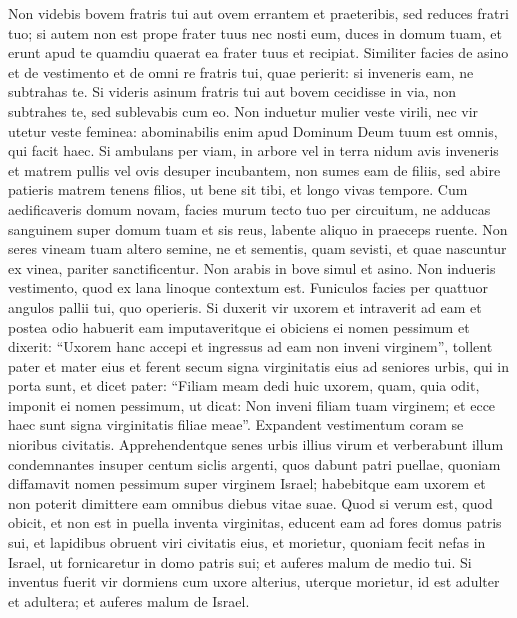 \begin{biblechapter} 
\verse Non videbis bovem fratris tui aut ovem errantem et praeteribis, sed reduces fratri tuo;  
\verse si autem non est prope frater tuus nec nosti eum, duces in domum tuam, et erunt apud te quamdiu quaerat ea frater tuus et recipiat. 
\verse Similiter facies de asino et de vestimento et de omni re fratris tui, quae perierit: si inveneris eam, ne subtrahas te. 
\verse Si videris asinum fratris tui aut bovem cecidisse in via, non subtrahes te, sed sublevabis cum eo. 
\verse Non induetur mulier veste virili, nec vir utetur veste feminea: abominabilis enim apud Dominum Deum tuum est omnis, qui facit haec. 
\verse Si ambulans per viam, in arbore vel in terra nidum avis inveneris et matrem pullis vel ovis desuper incubantem, non sumes eam de filiis, 
\verse sed abire patieris matrem tenens filios, ut bene sit tibi, et longo vivas tempore. 
\verse Cum aedificaveris domum novam, facies murum tecto tuo per circuitum, ne adducas sanguinem super domum tuam et sis reus, labente aliquo in praeceps ruente. 
\verse Non seres vineam tuam altero semine, ne et sementis, quam sevisti, et quae nascuntur ex vinea, pariter sanctificentur. 
\verse Non arabis in bove simul et asino. 
\verse Non indueris vestimento, quod ex lana linoque contextum est. 
\verse Funiculos facies per quattuor angulos pallii tui, quo operieris. 
\verse Si duxerit vir uxorem et intraverit ad eam et postea odio habuerit eam 
\verse imputaveritque ei obiciens ei nomen pessimum et dixerit: “Uxorem hanc accepi et ingressus ad eam non inveni virginem”, 
\verse tollent pater et mater eius et ferent secum signa virginitatis eius ad seniores urbis, qui in porta sunt,  
\verse et dicet pater: “Filiam meam dedi huic uxorem, quam, quia odit, 
\verse imponit ei nomen pessimum, ut dicat: Non inveni filiam tuam virginem; et ecce haec sunt signa virginitatis filiae meae”. Expandent vestimentum coram se nioribus civitatis. 
\verse Apprehendentque senes urbis illius virum et verberabunt illum 
\verse condemnantes insuper centum siclis argenti, quos dabunt patri puellae, quoniam diffamavit nomen pessimum super virginem Israel; habebitque eam uxorem et non poterit dimittere eam omnibus diebus vitae suae. 
\verse Quod si verum est, quod obicit, et non est in puella inventa virginitas,  
\verse educent eam ad fores domus patris sui, et lapidibus obruent viri civitatis eius, et morietur, quoniam fecit nefas in Israel, ut fornicaretur in domo patris sui; et auferes malum de medio tui. 
\verse Si inventus fuerit vir dormiens cum uxore alterius, uterque morietur, id est adulter et adultera; et auferes malum de Israel. 

\end{biblechapter}
